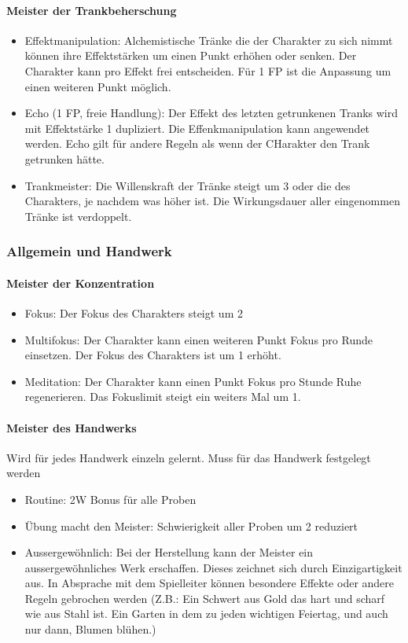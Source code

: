 \documentclass{article}
\begin{document}
\paragraph{Meister der Trankbeherschung}

\begin{itemize}
\item Effektmanipulation: Alchemistische Tränke die der Charakter zu sich nimmt können ihre Effektstärken um einen Punkt erhöhen oder senken. Der Charakter kann pro Effekt frei entscheiden. Für 1 FP ist die Anpassung um einen weiteren Punkt möglich.
\item Echo (1 FP, freie Handlung): Der Effekt des letzten getrunkenen Tranks wird mit Effektstärke 1 dupliziert. Die Effenkmanipulation kann angewendet werden. Echo gilt für andere Regeln als wenn der CHarakter den Trank getrunken hätte.
\item Trankmeister: Die Willenskraft der Tränke steigt um 3 oder die des Charakters, je nachdem was höher ist. Die Wirkungsdauer aller eingenommen Tränke ist verdoppelt.
\end{itemize}

\subsubsection{Allgemein und Handwerk}

\paragraph{Meister der Konzentration}

\begin{itemize}
\item Fokus: Der Fokus des Charakters steigt um 2
\item Multifokus: Der Charakter kann einen weiteren Punkt Fokus pro Runde einsetzen. Der Fokus des Charakters ist um 1 erhöht.
\item Meditation: Der Charakter kann einen Punkt Fokus pro Stunde Ruhe regenerieren. Das Fokuslimit steigt ein weiters Mal um 1.
\end{itemize}

\paragraph{Meister des Handwerks}

Wird für jedes Handwerk einzeln gelernt. Muss für das Handwerk festgelegt werden

\begin{itemize}
\item Routine: 2W Bonus für alle Proben
\item Übung macht den Meister: Schwierigkeit aller Proben um 2 reduziert
\item Aussergewöhnlich: Bei der Herstellung kann der Meister ein aussergewöhnliches Werk erschaffen. Dieses zeichnet sich durch Einzigartigkeit aus. In Absprache mit dem Spielleiter können besondere Effekte oder andere Regeln gebrochen werden (Z.B.: Ein Schwert aus Gold das hart und scharf wie aus Stahl ist. Ein Garten in dem zu jeden wichtigen Feiertag, und auch nur dann, Blumen blühen.)
\end{itemize}
\end{document}
